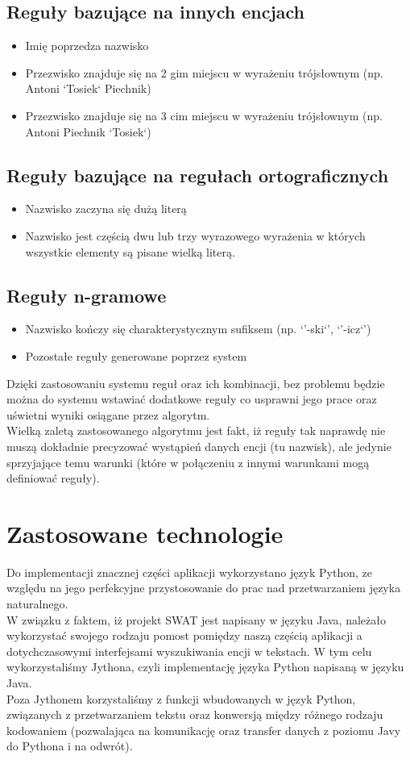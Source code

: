 \documentclass[12pt]{article}
\begin{document}
\subsection {Reguły bazujące na innych encjach}
\begin{itemize}
\item Imię poprzedza nazwisko
\item Przezwisko znajduje się na 2 gim miejscu w wyrażeniu trójsłownym (np. Antoni `Tosiek` Piechnik)
\item Przezwisko znajduje się na 3 cim miejscu w wyrażeniu trójsłownym (np. Antoni Piechnik `Tosiek`)
\end{itemize}

\subsection {Reguły bazujące na regułach ortograficznych }
\begin{itemize}
\item Nazwisko zaczyna się dużą literą
\item Nazwisko jest częścią dwu lub trzy wyrazowego wyrażenia w których wszystkie elementy są pisane wielką literą.
\end{itemize}

\subsection {Reguły n-gramowe}
\begin{itemize}
\item Nazwisko kończy się charakterystycznym sufiksem (np. `'-ski`', `'-icz`')
\item Pozostałe reguły generowane poprzez system
\end{itemize}
Dzięki zastosowaniu systemu reguł oraz ich kombinacji, bez problemu będzie można do systemu wstawiać dodatkowe reguły co usprawni jego prace oraz uświetni wyniki osiągane przez algorytm.
\\Wielką zaletą zastosowanego algorytmu jest fakt, iż reguły tak naprawdę nie muszą dokładnie precyzować wystąpień danych encji (tu nazwisk), ale jedynie sprzyjające temu warunki (które w połączeniu z innymi warunkami mogą definiować reguły).

\section {Zastosowane technologie}
Do implementacji znacznej części aplikacji wykorzystano język Python, ze względu na jego perfekcyjne przystosowanie do prac nad przetwarzaniem języka naturalnego.
\\W związku z faktem, iż projekt SWAT jest napisany w języku Java, należało wykorzystać swojego rodzaju pomost pomiędzy naszą częścią aplikacji a dotychczasowymi interfejsami wyszukiwania encji w tekstach. W tym celu wykorzystaliśmy Jythona, czyli implementację języka Python napisaną w języku Java.
\\Poza Jythonem korzystaliśmy z funkcji wbudowanych w język Python, związanych z przetwarzaniem tekstu oraz konwersją między różnego rodzaju kodowaniem (pozwalająca na komunikację oraz transfer danych z poziomu Javy do Pythona i na odwrót).
\end{document}
